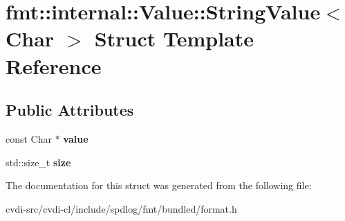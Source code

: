 \hypertarget{structfmt_1_1internal_1_1Value_1_1StringValue}{}\section{fmt\+:\+:internal\+:\+:Value\+:\+:String\+Value$<$ Char $>$ Struct Template Reference}
\label{structfmt_1_1internal_1_1Value_1_1StringValue}
\subsection*{Public Attributes}
\begin{DoxyCompactItemize}
\item 
const Char $\ast$ {\bfseries value}\hypertarget{structfmt_1_1internal_1_1Value_1_1StringValue_a5fcfe566f56e4bbf08748303cd7fa6ca}{}\label{structfmt_1_1internal_1_1Value_1_1StringValue_a5fcfe566f56e4bbf08748303cd7fa6ca}

\item 
std\+::size\+\_\+t {\bfseries size}\hypertarget{structfmt_1_1internal_1_1Value_1_1StringValue_abd1880f3fb3618e37fb3df74ff623146}{}\label{structfmt_1_1internal_1_1Value_1_1StringValue_abd1880f3fb3618e37fb3df74ff623146}

\end{DoxyCompactItemize}


The documentation for this struct was generated from the following file\+:\begin{DoxyCompactItemize}
\item 
cvdi-\/src/cvdi-\/cl/include/spdlog/fmt/bundled/format.\+h\end{DoxyCompactItemize}
